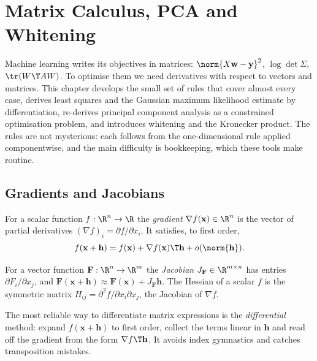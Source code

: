 \chapter{Matrix Calculus, PCA and Whitening}

Machine learning writes its objectives in matrices: $\norm{X\mathbf{w}-\mathbf{y}}^2$, $\log\det\Sigma$, $\tr(W\T AW)$. To optimise them we need derivatives with respect to vectors and matrices. This chapter develops the small set of rules that cover almost every case, derives least squares and the Gaussian maximum likelihood estimate by differentiation, re-derives principal component analysis as a constrained optimisation problem, and introduces whitening and the Kronecker product. The rules are not mysterious: each follows from the one-dimensional rule applied componentwise, and the main difficulty is bookkeeping, which these tools make routine.

\section{Gradients and Jacobians}

\begin{definition}[Gradient]
For a scalar function $f:\R^n\to\R$ the \emph{gradient} $\nabla f(\mathbf{x})\in\R^n$ is the vector of partial derivatives $(\nabla f)_i=\partial f/\partial x_i$. It satisfies, to first order,
\[ f(\mathbf{x}+\mathbf{h})=f(\mathbf{x})+\nabla f(\mathbf{x})\T\mathbf{h}+o(\norm{\mathbf{h}}). \]
\end{definition}

For a vector function $\mathbf{F}:\R^n\to\R^m$ the \emph{Jacobian} $J_{\mathbf{F}}\in\R^{m\times n}$ has entries $\partial F_i/\partial x_j$, and $\mathbf{F}(\mathbf{x}+\mathbf{h})\approx\mathbf{F}(\mathbf{x})+J_{\mathbf{F}}\mathbf{h}$. The Hessian of a scalar $f$ is the symmetric matrix $H_{ij}=\partial^2f/\partial x_i\partial x_j$, the Jacobian of $\nabla f$.

\begin{intuition}
The most reliable way to differentiate matrix expressions is the \emph{differential} method: expand $f(\mathbf{x}+\mathbf{h})$ to first order, collect the terms linear in $\mathbf{h}$ and read off the gradient from the form $\nabla f\T\mathbf{h}$. It avoids index gymnastics and catches transposition mistakes.
\end{intuition}

